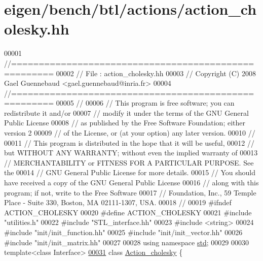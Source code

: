 \hypertarget{eigen_2bench_2btl_2actions_2action__cholesky_8hh_source}{}\section{eigen/bench/btl/actions/action\+\_\+cholesky.hh}
\label{eigen_2bench_2btl_2actions_2action__cholesky_8hh_source}

\begin{DoxyCode}
00001 \textcolor{comment}{//=====================================================}
00002 \textcolor{comment}{// File   :  action\_cholesky.hh}
00003 \textcolor{comment}{// Copyright (C) 2008 Gael Guennebaud <gael.guennebaud@inria.fr>}
00004 \textcolor{comment}{//=====================================================}
00005 \textcolor{comment}{//}
00006 \textcolor{comment}{// This program is free software; you can redistribute it and/or}
00007 \textcolor{comment}{// modify it under the terms of the GNU General Public License}
00008 \textcolor{comment}{// as published by the Free Software Foundation; either version 2}
00009 \textcolor{comment}{// of the License, or (at your option) any later version.}
00010 \textcolor{comment}{//}
00011 \textcolor{comment}{// This program is distributed in the hope that it will be useful,}
00012 \textcolor{comment}{// but WITHOUT ANY WARRANTY; without even the implied warranty of}
00013 \textcolor{comment}{// MERCHANTABILITY or FITNESS FOR A PARTICULAR PURPOSE.  See the}
00014 \textcolor{comment}{// GNU General Public License for more details.}
00015 \textcolor{comment}{// You should have received a copy of the GNU General Public License}
00016 \textcolor{comment}{// along with this program; if not, write to the Free Software}
00017 \textcolor{comment}{// Foundation, Inc., 59 Temple Place - Suite 330, Boston, MA  02111-1307, USA.}
00018 \textcolor{comment}{//}
00019 \textcolor{preprocessor}{#ifndef ACTION\_CHOLESKY}
00020 \textcolor{preprocessor}{#define ACTION\_CHOLESKY}
00021 \textcolor{preprocessor}{#include "utilities.h"}
00022 \textcolor{preprocessor}{#include "STL\_interface.hh"}
00023 \textcolor{preprocessor}{#include <string>}
00024 \textcolor{preprocessor}{#include "init/init\_function.hh"}
00025 \textcolor{preprocessor}{#include "init/init\_vector.hh"}
00026 \textcolor{preprocessor}{#include "init/init\_matrix.hh"}
00027 
00028 \textcolor{keyword}{using namespace }\hyperlink{namespacestd}{std};
00029 
00030 \textcolor{keyword}{template}<\textcolor{keyword}{class} Interface>
\hyperlink{class_action__cholesky}{00031} \textcolor{keyword}{class }\hyperlink{class_action__cholesky}{Action\_cholesky} \{

\end{DoxyCode}
